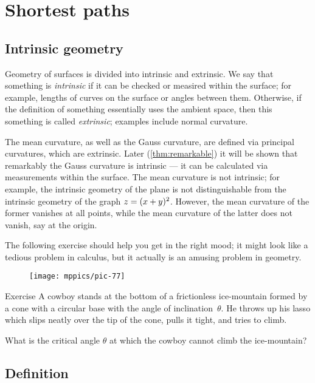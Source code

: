 \chapter{Shortest paths}
\label{chap:shortest}

\section{Intrinsic geometry}

Geometry of surfaces is divided into intrinsic and extrinsic.
We say that something is \emph{intrinsic} if it can be checked or measired within the surface;
for example, lengths of curves on the surface or angles between them.
Otherwise, if the definition of something essentially uses the ambient space, then this something is called \emph{extrinsic};
examples include normal curvature.

The mean curvature, as well as the Gauss curvature, are defined via principal curvatures, which are extrinsic.
Later (\ref{thm:remarkable}) it will be shown that remarkably the Gauss curvature is intrinsic --- it can be calculated via measurements within the surface.
The mean curvature is not intrinsic; for example, the intrinsic geometry of the plane is not distinguishable from the intrinsic geometry of the graph $z\z=(x+y)^2$.
However, the mean curvature of the former vanishes at all points, while the mean curvature of the latter does not vanish, say at the origin.  

The following exercise should help you get in the right mood;
it might look like a tedious problem in calculus, but it actually is an amusing problem in geometry.

\begin{wrapfigure}[6]{r}{33 mm}
\vskip-0mm
\centering
\texttt{[image: mppics/pic-77]}
\vskip-0mm
\end{wrapfigure}

\begin{thm}{Exercise}\label{ex:lasso}
A cowboy stands at the bottom of a frictionless ice-mountain formed by a cone with a circular base with the angle of inclination~$\theta$.
He throws up his lasso which slips neatly over the tip of the cone, pulls it tight, and tries to climb.

What is the critical angle $\theta$ at which the cowboy cannot climb the ice-mountain?
\end{thm}

\section{Definition}


